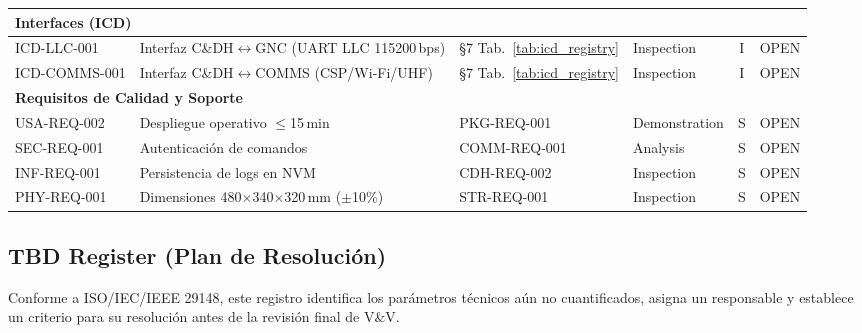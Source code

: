 \begin{landscape}
\begin{longtable}{| l | p{4.8cm} | p{3.6cm} | l | c | c |}
\multicolumn{6}{|l|}{\textbf{Interfaces (ICD)}} \\ \hline
ICD-LLC-001 & Interfaz C\&DH$\leftrightarrow$GNC (UART LLC 115200\,bps) & §7 Tab.~\ref{tab:icd_registry} & Inspection & I & OPEN \\
ICD-COMMS-001 & Interfaz C\&DH$\leftrightarrow$COMMS (CSP/Wi-Fi/UHF) & §7 Tab.~\ref{tab:icd_registry} & Inspection & I & OPEN \\ \hline

\multicolumn{6}{|l|}{\textbf{Requisitos de Calidad y Soporte}} \\ \hline
USA-REQ-002 & Despliegue operativo $\le$15\,min & PKG-REQ-001 & Demonstration & S & OPEN \\
SEC-REQ-001 & Autenticación de comandos & COMM-REQ-001 & Analysis & S & OPEN \\
INF-REQ-001 & Persistencia de logs en NVM & CDH-REQ-002 & Inspection & S & OPEN \\
PHY-REQ-001 & Dimensiones 480$\times$340$\times$320\,mm ($\pm$10\%) & STR-REQ-001 & Inspection & S & OPEN \\

\end{longtable}
\end{landscape}

\subsection{TBD Register (Plan de Resolución)}
Conforme a ISO/IEC/IEEE 29148, este registro identifica los parámetros técnicos aún no cuantificados, asigna un responsable y establece un criterio para su resolución antes de la revisión final de V\&V.

